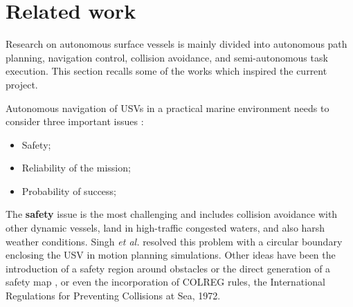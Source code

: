 
\section{Related work}
Research on autonomous surface vessels is mainly divided into autonomous path planning, navigation control, collision avoidance, and semi-autonomous task execution. This section recalls some of the works which inspired the current project.

Autonomous navigation of USVs in a practical marine environment needs to consider three important issues \cite{lavalle2006planning, statheros2008autonomous, singh2018constrained}:
\begin{itemize}[itemsep=0pt]
	\item Safety;
	\item Reliability of the mission;
	\item Probability of success;
\end{itemize} 
The \textbf{safety} issue is the most challenging and includes collision avoidance with other dynamic vessels, land in high-traffic congested waters, and also harsh weather conditions. Singh \textit{et al.} \cite{singh2018constrained} resolved this problem with a circular boundary enclosing the USV in motion planning simulations. Other ideas have been the introduction of a safety region around obstacles \cite{serigstad2018hybrid} or the direct generation of a safety map \cite{liu2017predictive}, or even the incorporation of COLREG rules, the International Regulations for Preventing Collisions at Sea, 1972.
\vspace{0.3cm}

